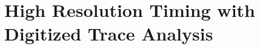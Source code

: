 %
%
%
%
%
%
%
%
%
%
%
%
%
%
%
%
%
%
%
%
%


\section{High Resolution Timing with Digitized Trace Analysis}

